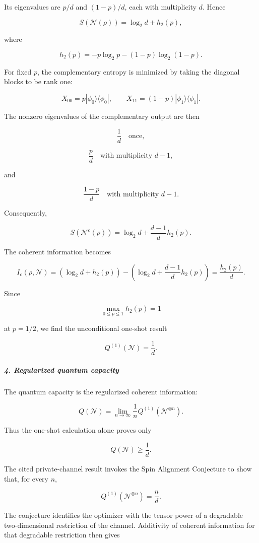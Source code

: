 Its eigenvalues are $p/d$ and $(1-p)/d$, each with multiplicity $d$. Hence

\[
S(\mathcal N(\rho)) = \log_2 d+h_2(p),
\]

where

\[
h_2(p)=-p\log_2p-(1-p)\log_2(1-p).
\]

For fixed $p$, the complementary entropy is minimized by taking the diagonal blocks to be rank one:

\[
X_{00}=p|\phi_0\rangle\langle\phi_0|, \qquad X_{11}=(1-p)|\phi_1\rangle\langle\phi_1|.
\]

The nonzero eigenvalues of the complementary output are then

\[
\frac{1}{d} \quad\text{once},
\]

\[
\frac{p}{d} \quad\text{with multiplicity }d-1,
\]

and

\[
\frac{1-p}{d} \quad\text{with multiplicity }d-1.
\]

Consequently,

\[
S(\mathcal N^c(\rho)) = \log_2d+\frac{d-1}{d}h_2(p).
\]

The coherent information becomes

\[
I_c(\rho,\mathcal N) = \left(\log_2d+h_2(p)\right) - \left(\log_2d+\frac{d-1}{d}h_2(p)\right) = \frac{h_2(p)}{d}.
\]

Since

\[
\max_{0\leq p\leq1}h_2(p)=1
\]

at $p=1/2$, we find the unconditional one-shot result

\[
{ Q^{(1)}(\mathcal N)=\frac{1}{d}. }
\]

\subparagraph*{4. Regularized quantum capacity}

The quantum capacity is the regularized coherent information:

\[
Q(\mathcal N) = \lim_{n\rightarrow\infty} \frac{1}{n} Q^{(1)}(\mathcal N^{\otimes n}).
\]

Thus the one-shot calculation alone proves only

\[
Q(\mathcal N)\geq \frac{1}{d}.
\]

The cited private-channel result invokes the Spin Alignment Conjecture to show that, for every $n$,

\[
Q^{(1)}(\mathcal N^{\otimes n}) = \frac{n}{d}.
\]

The conjecture identifies the optimizer with the tensor power of a degradable two-dimensional restriction of the channel. Additivity of coherent information for that degradable restriction then gives

